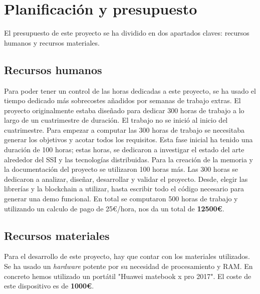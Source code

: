 \chapter{Planificación y presupuesto}\label{Planificación y presupuesto}

\thispagestyle{fancy}

El presupuesto de este proyecto se ha dividido en dos apartados claves: recursos humanos y recursos materiales.
\section{Recursos humanos}
Para poder tener un control de las horas dedicadas a este proyecto, se ha usado el tiempo dedicado más sobrecostes añadidos por semanas de trabajo extras. El proyecto originalmente estaba diseñado para dedicar 300 horas de trabajo a lo largo de un cuatrimestre de duración. El trabajo no se inició al inicio del cuatrimestre. Para empezar a computar las 300 horas de trabajo se necesitaba generar los objetivos y acotar todos los requisitos. Esta fase inicial ha tenido una duración de 100 horas; estas horas, se dedicaron a investigar el estado del arte alrededor del SSI y las tecnologías distribuidas. Para la creación de la memoria y la documentación del proyecto se utilizaron 100 horas más. Las 300 horas se dedicaron a analizar, diseñar, desarrollar y validar el proyecto. Desde, elegir las librerías y la blockchain a utilizar, hasta escribir todo el código necesario para generar una demo funcional. En total se computaron 500 horas de trabajo y utilizando un calculo de pago de 25\euro/hora, nos da un total de \textbf{12500\euro}.
\section{Recursos materiales}
Para el desarrollo de este proyecto, hay que contar con los materiales utilizados. Se ha usado un \textit{hardware} potente por su necesidad de procesamiento y RAM. En concreto hemos utilizado un portátil "Huawei matebook x pro 2017". El coste de este dispositivo es de \textbf{1000\euro}.
